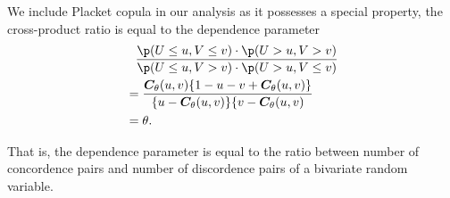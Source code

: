 We include Placket copula in our analysis as it possesses a special property,
the cross-product ratio is equal to the dependence parameter
\begin{align}
    &\phantom{=} \frac{\p(U \leq u, V \leq v) \cdot \p(U > u, V > v)}
    {\p(U \leq u, V > v) \cdot \p(U > u, V \leq v)}\nonumber\\
    &= \frac{\bm{C}_\theta(u,v)\{1-u-v+\bm{C}_\theta(u,v)\}}{\{u-\bm{C}_\theta(u,v)\}\{v-\bm{C}_\theta(u,v)}\nonumber\\
    &= \theta.
    \end{align}\medskip

That is, the dependence parameter is equal to the ratio between number of concordence pairs and number of discordence pairs of a bivariate random variable.


